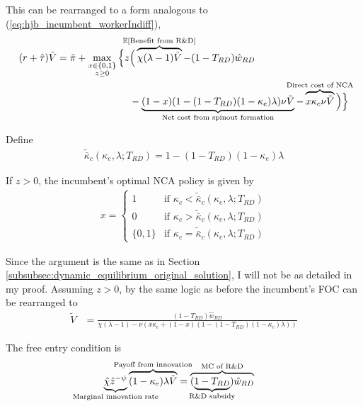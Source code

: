 \documentclass[11pt,english]{article}
\theoremstyle{remark}
\begin{document}
This can be rearranged to a form analogous to (\ref{eq:hjb_incumbent_workerIndiff}),
\begin{align}
	(r + \hat{\tau}) \tilde{V} = \tilde{\pi} + \max_{\substack{x \in \{0,1\} \\ z \ge 0}} \Big\{z &\Big( \overbrace{\chi (\lambda - 1) \tilde{V}}^{\mathclap{\mathbb{E}[\textrm{Benefit from R\&D}]}}- (1-T_{RD}) \hat{w}_{RD} \\
	&-  \underbrace{(1-x)(1 - (1-T_{RD})(1-\kappa_{e})\lambda)\nu \tilde{V}}_{\mathclap{\text{Net cost from spinout formation}}} - \overbrace{x \kappa_{c} \nu \tilde{V}}^{\mathclap{\text{Direct cost of NCA}}}\Big) \Big\} \label{eq:hjb_incumbent_RDsubsidy_2}
\end{align}

Define
\begin{align}
	\tilde{\bar{\kappa}}_c(\kappa_e,\lambda;T_{RD}) = 1 - (1-T_{RD})(1-\kappa_e)\lambda
\end{align} 

If $z > 0$, the incumbent's optimal NCA policy is given by 
\begin{align}
x = \begin{cases}
1 & \textrm{if } \kappa_{c} < \tilde{\bar{\kappa}}_c (\kappa_e, \lambda;T_{RD}) \\
0 & \textrm{if } \kappa_{c} > \tilde{\bar{\kappa}}_c (\kappa_e, \lambda;T_{RD})\\
\{0,1\} & \textrm{if } \kappa_c = \tilde{\bar{\kappa}}_c (\kappa_e, \lambda;T_{RD})
\end{cases} \label{eq:nca_policy_RDsubsidy}
\end{align}

Since the argument is the same as in Section \ref{subsubsec:dynamic_equilibrium_original_solution}, I will not be as detailed in my proof. Assuming $z > 0$, by the same logic as before the incumbent's FOC can be rearranged to
\begin{align}
	\tilde{V} &= \frac{(1-T_{RD})\hat{w}_{RD}}{\chi(\lambda -1) - \nu (x\kappa_c + (1-x)(1 - (1-T_{RD})(1-\kappa_e)\lambda)) } \label{eq:hjb_incumbent_foc_RDsubsidy}
\end{align}

The free entry condition is
\begin{align}
\underbrace{\hat{\chi} \hat{z}^{-\psi}}_{\mathclap{\text{Marginal innovation rate}}} \overbrace{(1-\kappa_e) \lambda \tilde{V}}^{\mathclap{\text{Payoff from innovation}}} &= \overbrace{(\underbrace{1-T_{RD}}_{\mathclap{\text{R\&D subsidy}}})\hat{w}_{RD}}^{\mathclap{\text{MC of R\&D}}} \label{eq:free_entry_condition_RDsubsidy}
\end{align}
\end{document}
